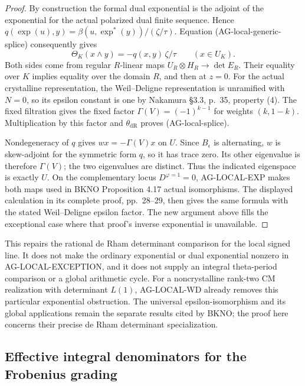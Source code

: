 \begin{proof}
By construction the formal dual exponential is the
adjoint of the exponential for the actual polarized
dual finite sequence.  Hence
$q(\exp(u),y)=\beta(u,\exp^*(y))/(\zeta/\tau)$.
Equation (AG-local-generic-splice) consequently gives
\[
            \Theta_K(x\wedge y)
                  =-q(x,y)\,\zeta/\tau
                    \qquad(x\in U_K).
\]
Both sides come from regular $R$-linear maps
$U_R\otimes H_R\to\det E_R$.  Their equality over
$K$ implies equality over the domain $R$, and then
at $z=0$.  For the actual crystalline representation,
the Weil--Deligne representation is unramified with
$N=0$, so its epsilon constant is one by Nakamura
\S3.3, p.~35, property (4).  The fixed filtration
gives the fixed factor
$\Gamma(V)=(-1)^{k-1}$ for weights $(k,1-k)$.
Multiplication by this factor and $\theta_{\mathrm{dR}}$
proves (AG-local-splice).

Nondegeneracy of $q$ gives $wx=-\Gamma(V)x$ on $U$.
Since $B_\epsilon$ is alternating, $w$ is skew-adjoint
for the symmetric form $q$, so it has trace zero.
Its other eigenvalue is therefore $\Gamma(V)$;
the two eigenvalues are distinct.  Thus the indicated
eigenspace is exactly $U$.  On the complementary locus
$D^{\varphi=1}=0$, AG-LOCAL-EXP makes both maps used
in BKNO Proposition 4.17 actual isomorphisms.  The
displayed calculation in its complete proof,
pp.~28--29, then gives the same formula with the
stated Weil--Deligne epsilon factor.  The new argument
above fills the exceptional case where that proof's
inverse exponential is unavailable.
\end{proof}

This repairs the rational de Rham determinant comparison
for the local signed line.  It does not make the ordinary
exponential or dual exponential nonzero in
AG-LOCAL-EXCEPTION, and it does not supply an integral
theta-period comparison or a global arithmetic cycle.
For a noncrystalline rank-two CM realization with
determinant $L(1)$, AG-LOCAL-WD already removes this
particular exponential obstruction.  The universal
epsilon-isomorphism and its global applications remain
the separate results cited by BKNO; the proof here
concerns their precise de Rham determinant specialization.

\subsection{Effective integral denominators for the Frobenius grading}

